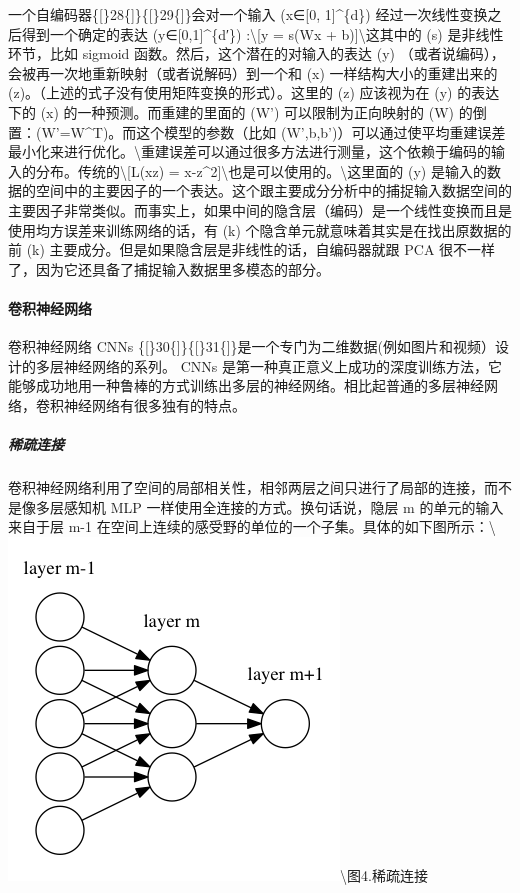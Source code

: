 一个自编码器\{{[}\}28\{{]}\}\{{[}\}29\{{]}\}会对一个输入 (x∈{[}0,
1{]}\^{}\{d\}) 经过一次线性变换之后得到一个确定的表达
(y∈{[}0,1{]}\^{}\{d′\}) :\textbackslash{}{[}y = s(Wx +
b){]}\textbackslash{}这其中的 (s) 是非线性环节，比如 sigmoid
函数。然后，这个潜在的对输入的表达 (y)
（或者说编码），会被再一次地重新映射（或者说解码）到一个和 (x)
一样结构大小的重建出来的
(z)。（上述的式子没有使用矩阵变换的形式）。这里的 (z) 应该视为在 (y)
的表达下的 (x) 的一种预测。而重建的里面的 (W') 可以限制为正向映射的 (W)
的倒置：(W'=W\^{}T)。而这个模型的参数（比如
(W',b,b')）可以通过使平均重建误差最小化来进行优化。\textbackslash{}重建误差可以通过很多方法进行测量，这个依赖于编码的输入的分布。传统的\textbackslash{}{[}L(xz)
=
\textbar{}\textbar{}x-z\textbar{}\textbar{}\^{}2{]}\textbackslash{}也是可以使用的。\textbackslash{}这里面的
(y)
是输入的数据的空间中的主要因子的一个表达。这个跟主要成分分析中的捕捉输入数据空间的主要因子非常类似。而事实上，如果中间的隐含层（编码）是一个线性变换而且是使用均方误差来训练网络的话，有
(k) 个隐含单元就意味着其实是在找出原数据的前 (k)
主要成分。但是如果隐含层是非线性的话，自编码器就跟 PCA
很不一样了，因为它还具备了捕捉输入数据里多模态的部分。

\paragraph{卷积神经网络}\label{ux5377ux79efux795eux7ecfux7f51ux7edc}

卷积神经网络 CNNs
\{{[}\}30\{{]}\}\{{[}\}31\{{]}\}是一个专门为二维数据(例如图片和视频）设计的多层神经网络的系列。
CNNs
是第一种真正意义上成功的深度训练方法，它能够成功地用一种鲁棒的方式训练出多层的神经网络。相比起普通的多层神经网络，卷积神经网络有很多独有的特点。

\subparagraph{稀疏连接}\label{ux7a00ux758fux8fdeux63a5}

卷积神经网络利用了空间的局部相关性，相邻两层之间只进行了局部的连接，而不是像多层感知机
MLP 一样使用全连接的方式。换句话说，隐层 m 的单元的输入来自于层 m-1
在空间上连续的感受野的单位的一个子集。具体的如下图所示：\textbackslash{}\includegraphics{picture/sparse-connectivity.png}\textbackslash{}图4.稀疏连接

